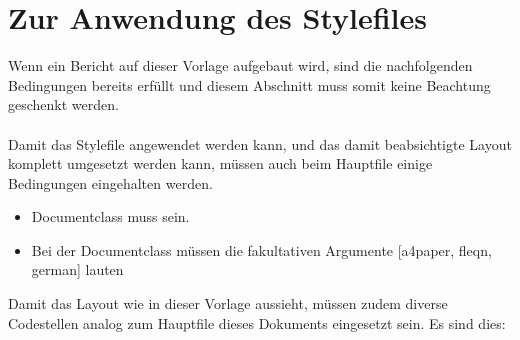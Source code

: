 \section{Zur Anwendung des Stylefiles }%
%
Wenn ein Bericht auf dieser Vorlage aufgebaut wird, sind die nachfolgenden Bedingungen bereits erfüllt und diesem Abschnitt muss somit keine Beachtung geschenkt werden.\\ \\%
Damit das Stylefile  angewendet werden kann, und das damit beabsichtigte Layout komplett umgesetzt werden kann, müssen auch beim Hauptfile einige Bedingungen eingehalten werden.%
%
\begin{itemize}%
\item Documentclass muss  sein.%
\item Bei der Documentclass müssen die fakultativen Argumente [a4paper, fleqn, german] lauten%
\end{itemize}%
%
Damit das Layout wie in dieser Vorlage aussieht, müssen zudem diverse Codestellen analog zum Hauptfile dieses Dokuments eingesetzt sein. Es sind dies:%
%
